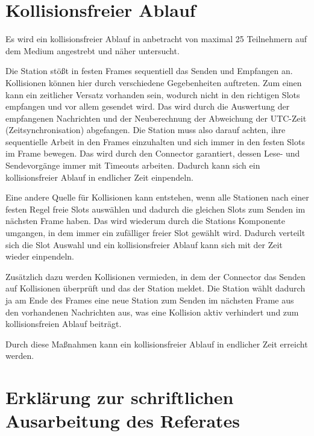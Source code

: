 \documentclass[draft=false
              ,paper=a4
              ,twoside=false
              ,fontsize=11pt
              ,headsepline
              ,BCOR10mm
              ,DIV11
              ]{scrbook}
\begin{document}
\chapter{Kollisionsfreier Ablauf}
Es wird ein kollisionsfreier Ablauf in anbetracht von maximal 25 Teilnehmern auf dem Medium angestrebt und näher untersucht.

Die Station stößt in festen Frames sequentiell das Senden und Empfangen an. Kollisionen können hier durch verschiedene Gegebenheiten auftreten.
Zum einen kann ein zeitlicher Versatz vorhanden sein, wodurch nicht in den richtigen Slots empfangen und vor allem gesendet wird. Das wird durch die Auswertung der empfangenen Nachrichten und der Neuberechnung der Abweichung der UTC-Zeit (Zeitsynchronisation) abgefangen.
Die Station muss also darauf achten, ihre sequentielle Arbeit in den Frames einzuhalten und sich immer in den festen Slots im Frame bewegen. Das wird durch den Connector garantiert, dessen Lese- und Sendevorgänge immer mit Timeouts arbeiten. Dadurch kann sich ein kollisionsfreier Ablauf in endlicher Zeit einpendeln.

Eine andere Quelle für Kollisionen kann entstehen, wenn alle Stationen nach einer festen Regel freie Slots auswählen und dadurch die gleichen Slots zum Senden im nächsten Frame haben. Das wird wiederum durch die Stations Komponente umgangen, in dem immer ein zufälliger freier Slot gewählt wird. Dadurch verteilt sich die Slot Auswahl und ein kollisionsfreier Ablauf kann sich mit der Zeit wieder einpendeln.

Zusätzlich dazu werden Kollisionen vermieden, in dem der Connector das Senden auf Kollisionen überprüft und das der Station meldet. Die Station wählt dadurch ja am Ende des Frames eine neue Station zum Senden im nächsten Frame aus den vorhandenen Nachrichten aus, was eine Kollision aktiv verhindert und zum kollisionsfreien Ablauf beiträgt.

Durch diese Maßnahmen kann ein kollisionsfreier Ablauf in endlicher Zeit erreicht werden.


\backmatter




\renewcommand{\nomname}{Glossar}
\clearpage
\markboth{\nomname}{\nomname} %
\printnomenclature

\printindex
\chapter{Erklärung zur schriftlichen Ausarbeitung des Referates}
\HAWasurency
\end{document}
